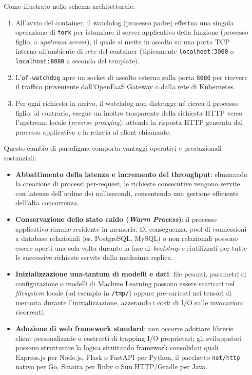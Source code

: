 \documentclass[11pt, a4paper]{article}
\begin{document}
Come illustrato nello schema architetturale:
\begin{enumerate}
    \item All'avvio del container, il watchdog (processo padre) effettua una singola operazione di \texttt{fork} per istanziare il server applicativo della funzione (processo figlio, o \emph{upstream server}), il quale si mette in ascolto su una porta TCP interna all'ambiente di rete del container (tipicamente \texttt{localhost:3000} o \texttt{localhost:8080} a seconda del template).
    \item L'\texttt{of-watchdog} apre un socket di ascolto esterno sulla porta \texttt{8080} per ricevere il traffico proveniente dall'OpenFaaS Gateway o dalla rete di Kubernetes.
    \item Per ogni richiesta in arrivo, il watchdog non distrugge né ricrea il processo figlio; al contrario, esegue un inoltro trasparente della richiesta HTTP verso l'upstream locale (\emph{reverse proxying}), attende la risposta HTTP generata dal processo applicativo e la reinvia al client chiamante.
\end{enumerate}

Questo cambio di paradigma comporta vantaggi operativi e prestazionali sostanziali:
\begin{itemize}[noitemsep]
    \item \textbf{Abbattimento della latenza e incremento del throughput}: eliminando la creazione di processi per-request, le richieste consecutive vengono servite con latenze dell'ordine dei millisecondi, consentendo una gestione efficiente dell'alta concorrenza.
    \item \textbf{Conservazione dello stato caldo (\emph{Warm Process})}: il processo applicativo rimane residente in memoria. Di conseguenza, pool di connessioni a database relazionali (es. PostgreSQL, MySQL) o non relazionali possono essere aperti una sola volta durante la fase di \emph{bootstrap} e riutilizzati per tutte le successive richieste servite dalla medesima replica.
    \item \textbf{Inizializzazione una-tantum di modelli e dati}: file pesanti, parametri di configurazione o modelli di Machine Learning possono essere scaricati nel \emph{filesystem} locale (ad esempio in \texttt{/tmp/}) oppure pre-caricati nei tensori di memoria durante l'inizializzazione, azzerando i costi di I/O sulle invocazioni ricorrenti.
    \item \textbf{Adozione di web framework standard}: non occorre adottare librerie client personalizzate o costrutti di trapping I/O proprietari; gli sviluppatori possono strutturare la logica sfruttando framework consolidati quali Express.js per Node.js, Flask o FastAPI per Python, il pacchetto \texttt{net/http} nativo per Go, Sinatra per Ruby o Sun HTTP/Gradle per Java.
\end{itemize}
\end{document}
